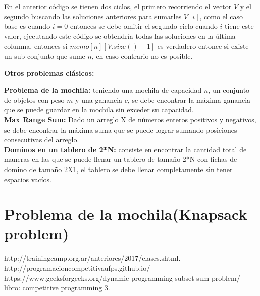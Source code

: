 \documentclass[12pt, a4paper]{article}
\newcommand{\subtitulo}[1]{\begin{center}\textbf{#1}\end{center}}
\begin{document}
	En el anterior código se tienen dos ciclos, el primero recorriendo el vector $V$ y el segundo buscando las 
	soluciones anteriores para sumarles $V[i]$, como el caso base es cuando $i=0$ entonces se debe omitir el segundo
	ciclo cuando $i$ tiene este valor, ejecutando este código se obtendría todas las soluciones en la última columna,
	entonces si $memo[n][V.size()-1]$ es verdadero entonce si existe un sub-conjunto que sume $n$, en caso contrario
	no es posible.

	
	\subtitulo{Otros problemas clásicos:}
	
	\textbf{Problema de la mochila:} teniendo una mochila de capacidad $n$, un conjunto de objetos con peso $m$ 
	y una ganancia $c$, se debe encontrar la máxima ganancia que se puede guardar en la mochila sin
	exceder su capacidad.\\
	
	\textbf{Max Range Sum:} Dado un arreglo X de números enteros positivos y negativos, se debe encontrar la
	máxima suma que se puede lograr sumando posiciones consecutivas del arreglo.\\
	
	\textbf{Dominos en un tablero de 2*N:} consiste en encontrar la cantidad total de maneras en las que se puede
	llenar un tablero de tamaño 2*N con fichas de domino de tamaño 2X1, el tablero se debe llenar completamente sin
	tener espacios vacíos.
	
	\section{Problema de la mochila(Knapsack problem)}
	
	http://trainingcamp.org.ar/anteriores/2017/clases.shtml.\\
	http://programacioncompetitivaufps.github.io/\\
	https://www.geeksforgeeks.org/dynamic-programming-subset-sum-problem/\\
	libro: competitive programming 3.\\
\end{document}
